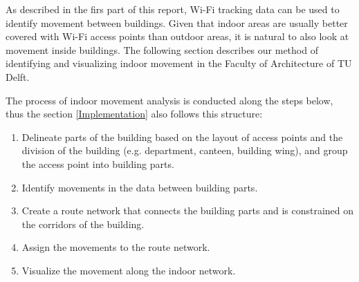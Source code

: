As described in the firs part of this report, Wi-Fi tracking data can be used to
identify movement between buildings. Given that indoor areas are usually better
covered with Wi-Fi access points than outdoor areas, it is natural to also look
at movement inside buildings. The following section describes our method of
identifying and visualizing indoor movement in the Faculty of Architecture of TU
Delft.

The process of indoor movement analysis is conducted along the steps below,
thus the section \autoref{Implementation} also follows this structure:

\begin{enumerate}
    \item Delineate parts of the building based on the layout of access points
and the division of the building (e.g. department, canteen, building wing), and
group the access point into building parts.
    \item Identify movements in the data between building parts.
    \item Create a route network that connects the building parts and
    is constrained on the corridors of the building.
    \item Assign the movements to the route network.
    \item Visualize the movement along the indoor network.
\end{enumerate}

